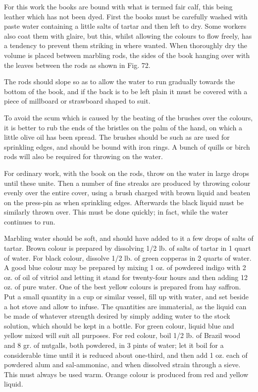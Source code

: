 \documentclass[twoside]{book}
\begin{document}
For this work the books are bound with what
is termed fair calf, this being leather which has
not been dyed. First the books must be carefully
washed with paste water containing a little salts of
tartar and then left to dry. Some workers also
coat them with glaire, but this, whilst allowing the
colours to flow freely, has a tendency to prevent
them striking in where wanted. When thoroughly
dry the volume is placed between marbling rods,
the sides of the book hanging over with the leaves
between the rods as shown in Fig. 72.

The rods should slope so as to allow the water
to run gradually towards the bottom of the book,
\pagebreak
and if the back is to be left plain it must be covered
with a piece of millboard or strawboard shaped
to suit.

To avoid the scum which is caused by the beating
of the brushes over the colours, it is better to rub
the ends of the bristles on the palm of the hand,
on which a little olive oil has been spread. The
brushes should be such as are used for sprinkling
edges, and should be bound with iron rings. A
bunch of quills or birch rods will also be required
for throwing on the water.

For ordinary work, with the book on the rods,
throw on the water in large drops until these unite.
Then a number of fine streaks are produced by
throwing colour evenly over the entire cover, using
a brush charged with brown liquid and beaten on
the press-pin as when sprinkling edges. Afterwards
the black liquid must be similarly thrown over.
This must be done quickly; in fact, while the water
continues to run.

Marbling water should be soft, and should have
added to it a few drops of salts of tartar. Brown
colour is prepared by dissolving 1/2 lb. of salts of
tartar in 1 quart of water. For black colour, dissolve
1/2 lb. of green copperas in 2 quarts of water. A
good blue colour may be prepared by mixing 1 oz.
of powdered indigo with 2 oz. of oil of vitriol and
letting it stand for twenty-four hours and then
adding 12 oz. of pure water. One of the best yellow
colours is prepared from hay saffron. Put a small
quantity in a cup or similar vessel, fill up with
water, and set beside a hot stove and allow to infuse.
The quantities are immaterial, as the liquid
can be made of whatever strength desired by simply
adding water to the stock solution, which should
be kept in a bottle. For green colour, liquid blue
and yellow mixed will suit all purposes. For red
colour, boil 1/2 lb. of Brazil wood and 8 gr. of
nutgalls, both powdered, in 3 pints of water; let it boil
\pagebreak
for a considerable time until it is reduced about
one-third, and then add 1 oz. each of powdered
alum and sal-ammoniac, and when dissolved strain
through a sieve. This must always be used warm.
Orange colour is produced from red and yellow
liquid.
\end{document}
